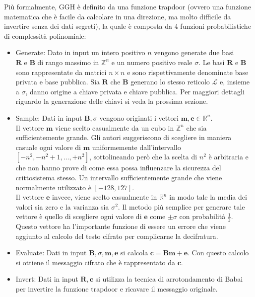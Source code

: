 Più formalmente, GGH è definito da una funzione trapdoor (ovvero una funzione matematica che è facile da 
calcolare in una direzione, ma molto difficile da invertire senza dei dati segreti), la quale
è composta da 4 funzioni probabilistiche di complessità polinomiale:
\begin{itemize}
    \item Generate: Dato in input un intero positivo $n$ vengono generate due basi 
    $\mathbf{R} \text{ e } \mathbf{B}$ di rango massimo in
    $\mathbb{Z}^n$ e un numero positivo reale $\sigma$. Le basi $\mathbf{R} \text{ e } \mathbf{B}$
    sono rappresentate da matrici $n \times n$ e sono rispettivamente denominate base 
    privata e base pubblica. Sia $\mathbf{R}$ che $\mathbf{B}$ generano lo stesso reticolo 
    $\mathcal{L}$ e, insieme a $\sigma$, danno origine a chiave privata e chiave pubblica.
    Per maggiori dettagli riguardo la generazione delle chiavi si veda la prossima sezione.
    \item Sample: Dati in input $\mathbf{B}, \sigma$ vengono originati i vettori
    $\mathbf{m},\mathbf{e} \in \mathbb{R}^n$. \\
    Il vettore $\mathbf{m}$ viene scelto casualmente da un cubo in $\mathbb{Z}^n$ che sia 
    sufficientemente grande. Gli autori suggeriscono di scegliere in maniera casuale
    ogni valore di $\mathbf{m}$ uniformemente dall'intervallo $[-n^2, -n^2 + 1, \dots, +n^2]$, 
    sottolineando però che la scelta di $n^2$ è arbitraria e che non hanno prove
    di come essa possa influenzare la sicurezza del crittosistema stesso. Un intervallo
    sufficientemente grande che viene normalmente utilizzato è $[-128, 127]$. \\
    Il vettore $\mathbf{e}$ invece, viene scelto casualmente in  $\mathbb{R}^n$ in modo
    tale la media dei valori sia zero e la varianza sia $\sigma^2$. Il metodo più semplice
    per generare tale vettore è quello di scegliere ogni valore di $\mathbf{e}$ come $\pm\sigma$
    con probabilità $\frac{1}{2}$. Questo vettore ha l'importante funzione di essere un errore
    che viene aggiunto al calcolo del testo cifrato per complicarne la decifratura. 
    \item Evaluate: Dati in input $\mathbf{B}, \sigma, \mathbf{m}, \mathbf{e}$ si calcola
    $\mathbf{c} = \mathbf{B}\mathbf{m} + \mathbf{e}$. Con questo calcolo si ottiene
    il messaggio cifrato che è rappresentato da $\mathbf{c}$. 
    \item Invert: Dati in input $\mathbf{R},\mathbf{c}$ si utilizza la tecnica di arrotondamento
    di Babai per invertire la funzione trapdoor e ricavare il messaggio originale.
\end{itemize}

%
%

%
%
